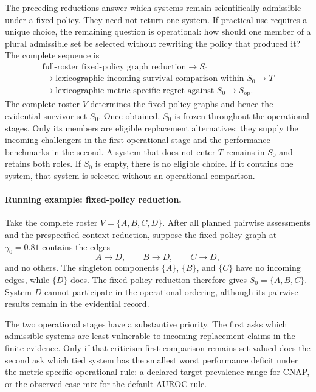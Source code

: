\documentclass[11pt]{article}
\theoremstyle{remark}
\begin{document}
The preceding reductions answer which systems remain scientifically
admissible under a fixed policy. They need not return one system. If practical
use requires a unique choice, the remaining question is operational: how
should one member of a plural admissible set be selected without rewriting the
policy that produced it? The complete sequence is
\[
\begin{gathered}
\text{full-roster fixed-policy graph reduction}
\longrightarrow S_0\\
\longrightarrow
\text{lexicographic incoming-survival comparison within }S_0
\longrightarrow T\\
\longrightarrow
\text{lexicographic metric-specific regret against }S_0
\longrightarrow S_{\mathrm{op}}.
\end{gathered}
\]
The complete roster $V$ determines the fixed-policy graphs and hence the
evidential survivor set $S_0$. Once obtained, $S_0$ is frozen throughout the
operational stages. Only its members are eligible replacement alternatives:
they supply the incoming challengers in the first operational stage and the
performance benchmarks in the second. A system that does not enter $T$
remains in $S_0$ and retains both roles. If $S_0$ is empty, there is no
eligible choice. If it contains one system, that system is selected without an
operational comparison.

\paragraph{Running example: fixed-policy reduction.}
Take the complete roster $V=\{A,B,C,D\}$. After all planned pairwise
assessments and the prespecified context reduction, suppose the fixed-policy
graph at $\gamma_0=0.81$ contains the edges
\[
A\longrightarrow D,
\qquad
B\longrightarrow D,
\qquad
C\longrightarrow D,
\]
and no others. The singleton components $\{A\}$, $\{B\}$, and $\{C\}$ have no
incoming edges, while $\{D\}$ does. The fixed-policy reduction therefore gives
$S_0=\{A,B,C\}$. System $D$ cannot participate in the operational ordering,
although its pairwise results remain in the evidential record.

The two operational stages have a substantive priority. The first asks which
admissible systems are least vulnerable to incoming replacement claims in the
finite evidence. Only if that criticism-first comparison remains set-valued
does the second ask which tied system has the smallest worst performance
deficit under the metric-specific operational rule: a declared target-prevalence
range for CNAP, or the observed case mix for the default AUROC rule.
\end{document}
